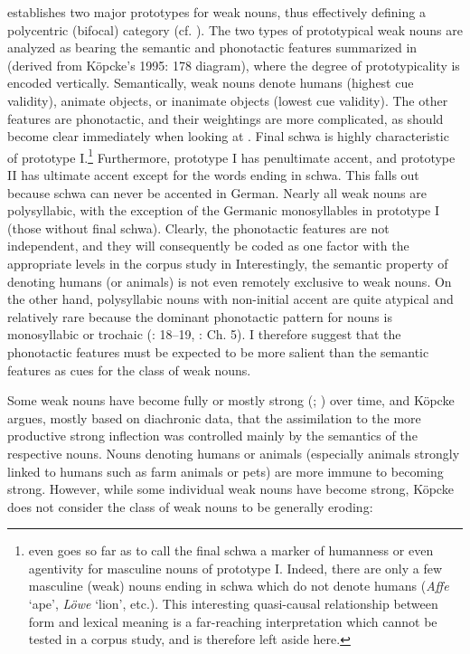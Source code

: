 \begin{styleMoutonText}
\citet{Köpcke1995} establishes two major prototypes for weak nouns, thus effectively defining a polycentric (bifocal) category (cf. ). The two types of prototypical weak nouns are analyzed as bearing the semantic and phonotactic features summarized in  (derived from Köpcke’s 1995: 178 diagram), where the degree of prototypicality is encoded vertically. Semantically, weak nouns denote humans (highest cue validity), animate objects, or inanimate objects (lowest cue validity). The other features are phonotactic, and their weightings are more complicated, as should become clear immediately when looking at . Final schwa is highly characteristic of prototype I.\footnote{\citet[119]{Köpcke2000} even goes so far as to call the final schwa a marker of humanness or even agentivity for masculine nouns of prototype I. Indeed, there are only a few masculine (weak) nouns ending in schwa which do not denote humans (\textit{Affe} ‘ape’, \textit{Löwe} ‘lion’, etc.). This interesting quasi-causal relationship between form and lexical meaning is a far-reaching interpretation which cannot be tested in a corpus study, and is therefore left aside here.} Furthermore, prototype I has penultimate accent, and prototype II has ultimate accent except for the words ending in schwa. This falls out because schwa can never be accented in German. Nearly all weak nouns are polysyllabic, with the exception of the Germanic monosyllables in prototype I (those without final schwa). Clearly, the phonotactic features are not independent, and they will consequently be coded as one factor with the appropriate levels in the corpus study in  Interestingly, the semantic property of denoting humans (or animals) is not even remotely exclusive to weak nouns. On the other hand, polysyllabic nouns with non-initial accent are quite atypical and relatively rare because the dominant phonotactic pattern for nouns is monosyllabic or trochaic (\citealt{Eisenberg2012}: 18–19, \citealt{Eisenberg2013}: Ch. 5). I therefore suggest that the phonotactic features must be expected to be more salient than the semantic features as cues for the class of weak nouns.
\end{styleMoutonText}

\begin{styleMoutonText}
Some weak nouns have become fully or mostly strong (\citealt{Wurzel1985}; \citealt{Joeres1996}) over time, and Köpcke argues, mostly based on diachronic data, that the assimilation to the more productive strong inflection was controlled mainly by the semantics of the respective nouns. Nouns denoting humans or animals (especially animals strongly linked to humans such as farm animals or pets) are more immune to becoming strong. However, while some individual weak nouns have become strong, Köpcke does not consider the class of weak nouns to be generally eroding:
\end{styleMoutonText}

